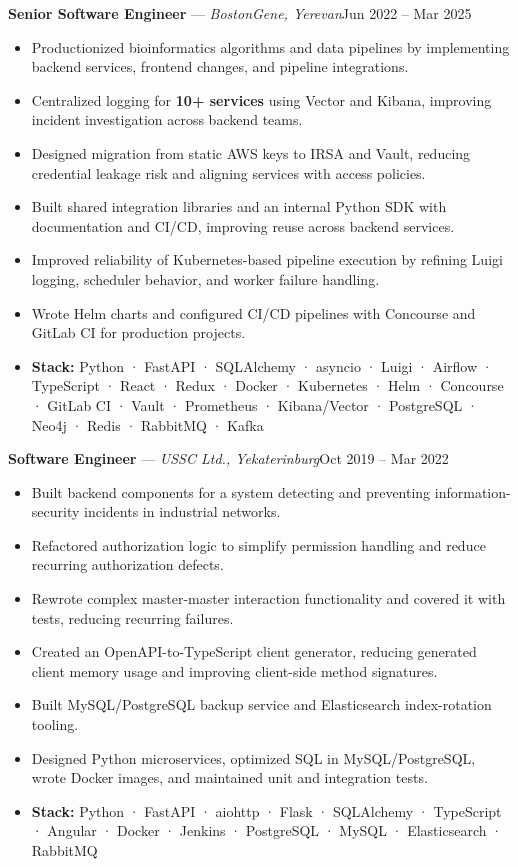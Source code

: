 \documentclass[10pt]{article}
\newenvironment{cvlist}{%
  \begin{itemize}%
  \setlength{\itemsep}{1pt}%
  \setlength{\topsep}{2pt}%
  \setlength{\parsep}{0pt}%
  \setlength{\leftmargin}{1.3em}%
  \small%
}{%
  \end{itemize}%
}
\newcommand{\job}[3]{%
  \textbf{#1} — \textit{#2}\hfill{\small\color{muted}#3}%
  \par\vspace{1pt}%
}
\begin{document}
\vspace{4pt}
\job{Senior Software Engineer}{BostonGene, Yerevan}{Jun 2022 – Mar 2025}
\begin{cvlist}
  \item Productionized bioinformatics algorithms and data pipelines by implementing backend services, frontend changes, and pipeline integrations.
  \item Centralized logging for \textbf{10+ services} using Vector and Kibana, improving incident investigation across backend teams.
  \item Designed migration from static AWS keys to IRSA and Vault, reducing credential leakage risk and aligning services with access policies.
  \item Built shared integration libraries and an internal Python SDK with documentation and CI/CD, improving reuse across backend services.
  \item Improved reliability of Kubernetes-based pipeline execution by refining Luigi logging, scheduler behavior, and worker failure handling.
  \item Wrote Helm charts and configured CI/CD pipelines with Concourse and GitLab CI for production projects.
  \item \textbf{Stack:} Python · FastAPI · SQLAlchemy · asyncio · Luigi · Airflow · TypeScript · React · Redux · Docker · Kubernetes · Helm · Concourse · GitLab CI · Vault · Prometheus · Kibana/Vector · PostgreSQL · Neo4j · Redis · RabbitMQ · Kafka
\end{cvlist}

\vspace{4pt}
\job{Software Engineer}{USSC Ltd., Yekaterinburg}{Oct 2019 – Mar 2022}
\begin{cvlist}
  \item Built backend components for a system detecting and preventing information-security incidents in industrial networks.
  \item Refactored authorization logic to simplify permission handling and reduce recurring authorization defects.
  \item Rewrote complex master-master interaction functionality and covered it with tests, reducing recurring failures.
  \item Created an OpenAPI-to-TypeScript client generator, reducing generated client memory usage and improving client-side method signatures.
  \item Built MySQL/PostgreSQL backup service and Elasticsearch index-rotation tooling.
  \item Designed Python microservices, optimized SQL in MySQL/PostgreSQL, wrote Docker images, and maintained unit and integration tests.
  \item \textbf{Stack:} Python · FastAPI · aiohttp · Flask · SQLAlchemy · TypeScript · Angular · Docker · Jenkins · PostgreSQL · MySQL · Elasticsearch · RabbitMQ
\end{cvlist}
\end{document}

